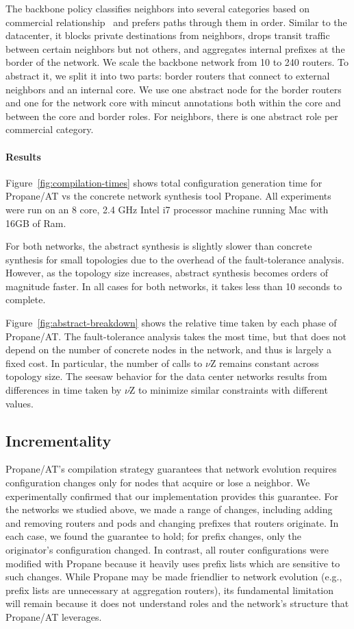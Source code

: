 \documentclass[numbers, 10pt]{sigplanconf}
\newcommand{\sysname}{{\text{}\small \sf Propane/AT}\xspace}
\newcommand{\Propane}{{\text{}\small \sf Propane}\xspace}
\newcommand{\para}[1]{\paragraph*{\textbf{#1}}}
\begin{document}

The backbone policy classifies neighbors into several categories based on commercial relationship~\cite{gao-rexford} and prefers paths through them in order. Similar to the datacenter, it blocks private destinations from neighbors, drops transit traffic between certain neighbors but not others, and aggregates internal prefixes at the border of the network.
%
We scale the backbone network from 10 to 240 routers. To abstract it, we split it into two parts: border routers that connect to external neighbors and an internal core. We use one abstract node for the border routers and one for the network core with mincut annotations both within the core and between the core and border roles. For neighbors, there is one abstract role per commercial category.

\para{Results}

Figure~\ref{fig:compilation-times} shows total configuration generation time for \sysname vs the concrete network synthesis tool \Propane. All experiments were run on an 8 core, 2.4 GHz Intel i7 processor machine running Mac with 16GB of Ram.

For both networks, the abstract synthesis is slightly slower than concrete synthesis for small topologies due to the overhead of the fault-tolerance analysis. However, as the topology size increases, abstract synthesis becomes orders of magnitude faster. In all cases for both networks, it takes less than 10 seconds to complete.

Figure~\ref{fig:abstract-breakdown} shows the relative time taken by each phase of \sysname. The fault-tolerance analysis takes the most time, but that does not depend on the number of concrete nodes in the network, and thus is largely a fixed cost. In particular, the number of calls to $\nu$Z remains constant across topology size. The seesaw behavior for the data center networks results from differences in time taken by $\nu$Z to minimize similar constraints with different values.

\subsection{Incrementality}
\label{sec:incrementality}

\sysname's compilation strategy guarantees that network evolution requires configuration changes only for nodes that acquire or lose a neighbor. We experimentally confirmed that our implementation provides this guarantee. For the networks we studied above, we made a range of changes, including adding and removing routers and pods and changing prefixes that routers originate. In each case, we found the guarantee to hold; for prefix changes, only the originator's configuration changed. In contrast, all router configurations were modified with \Propane because it heavily uses prefix lists which are sensitive to such changes. While \Propane may be made friendlier to network evolution (e.g., prefix lists are unnecessary at aggregation routers), its fundamental limitation will remain because it does not understand roles and the network's structure that \sysname leverages.
\end{document}
